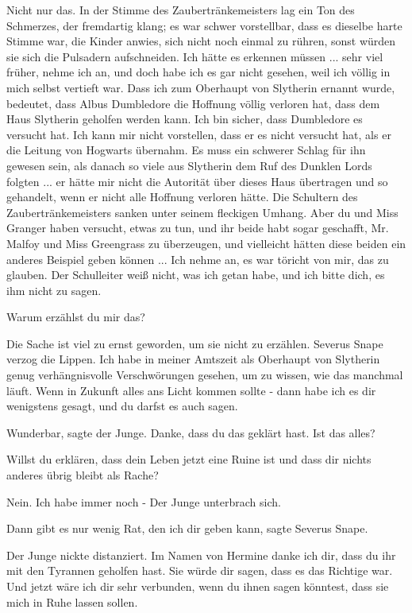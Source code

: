 \glqq Nicht nur das.\grqq{} In der Stimme des Zaubertränkemeisters lag ein Ton
des Schmerzes, der fremdartig klang; es war schwer vorstellbar, dass es dieselbe
harte Stimme war, die Kinder anwies, sich nicht noch einmal zu rühren, sonst
würden sie sich die Pulsadern aufschneiden. \glqq Ich hätte es erkennen müssen
... sehr viel früher, nehme ich an, und doch habe ich es gar nicht gesehen, weil
ich völlig in mich selbst vertieft war. Dass ich zum Oberhaupt von Slytherin
ernannt wurde, bedeutet, dass Albus Dumbledore die Hoffnung völlig verloren hat,
dass dem Haus Slytherin geholfen werden kann. Ich bin sicher, dass Dumbledore es
versucht hat. Ich kann mir nicht vorstellen, dass er es nicht versucht hat, als
er die Leitung von Hogwarts übernahm. Es muss ein schwerer Schlag für ihn
gewesen sein, als danach so viele aus Slytherin dem Ruf des Dunklen Lords
folgten ... er hätte mir nicht die Autorität über dieses Haus übertragen und so
gehandelt, wenn er nicht alle Hoffnung verloren hätte.\grqq{} Die Schultern des
Zaubertränkemeisters sanken unter seinem fleckigen Umhang. \glqq Aber du und
Miss Granger haben versucht, etwas zu tun, und ihr beide habt sogar geschafft,
Mr. Malfoy und Miss Greengrass zu überzeugen, und vielleicht hätten diese beiden
ein anderes Beispiel geben können ... Ich nehme an, es war töricht von mir, das
zu glauben. Der Schulleiter weiß nicht, was ich getan habe, und ich bitte dich,
es ihm nicht zu sagen.\grqq{}

\glqq Warum erzählst du mir das?\grqq{}

\glqq Die Sache ist viel zu ernst geworden, um sie nicht zu erzählen.\grqq{}
Severus Snape verzog die Lippen. \glqq Ich habe in meiner Amtszeit als Oberhaupt
von Slytherin genug verhängnisvolle Verschwörungen gesehen, um zu wissen, wie
das manchmal läuft. Wenn in Zukunft alles ans Licht kommen sollte - dann habe
ich es dir wenigstens gesagt, und du darfst es auch sagen.\grqq{}

\glqq Wunderbar\grqq{}, sagte der Junge. \glqq Danke, dass du das geklärt hast.
Ist das alles?\grqq{}

\glqq Willst du erklären, dass dein Leben jetzt eine Ruine ist und dass dir
nichts anderes übrig bleibt als Rache?\grqq{}

\glqq Nein. Ich habe immer noch -\grqq{} Der Junge unterbrach sich.

\glqq Dann gibt es nur wenig Rat, den ich dir geben kann\grqq{}, sagte Severus
Snape.

Der Junge nickte distanziert. \glqq Im Namen von Hermine danke ich dir, dass du
ihr mit den Tyrannen geholfen hast. Sie würde dir sagen, dass es das Richtige
war. Und jetzt wäre ich dir sehr verbunden, wenn du ihnen sagen könntest, dass
sie mich in Ruhe lassen sollen.\grqq{}

